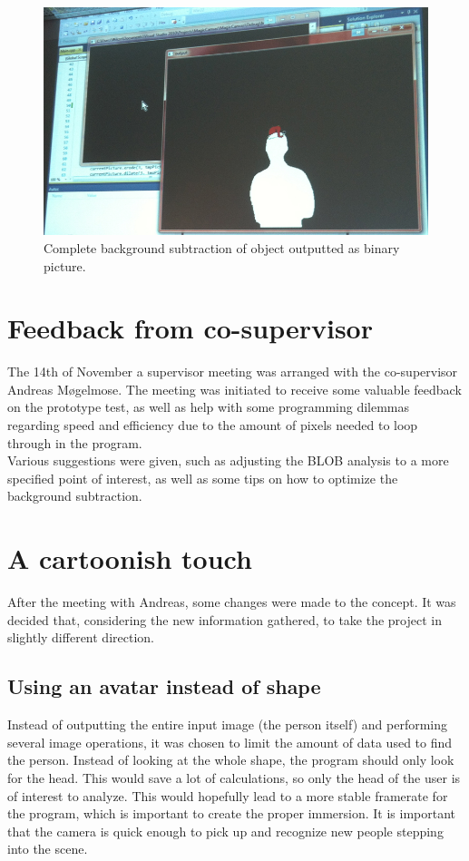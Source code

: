 \begin{figure}[htbp]
\centering
\includegraphics[width=1.00\textwidth]{Pictures/Test/MaxSubtracted.jpg}
\caption{Complete background subtraction of object outputted as binary picture.}
\label{fig:max_subtracted}
\end{figure}

\section{Feedback from co-supervisor}
The 14th of November a supervisor meeting was arranged with the co-supervisor Andreas M{\o}gelmose. The meeting was initiated to receive some valuable feedback on the prototype test, as well as help with some programming dilemmas regarding speed and efficiency due to the amount of pixels needed to loop through in the program.\\
Various suggestions were given, such as adjusting the BLOB analysis to a more specified point of interest, as well as some tips on how to optimize the background subtraction.

\section{A cartoonish touch}
After the meeting with Andreas, some changes were made to the concept. It was decided that, considering the new information gathered, to take the project in slightly different direction.

\subsection{Using an avatar instead of shape}
Instead of outputting the entire input image (the person itself) and performing several image operations, it was chosen to limit the amount of data used to find the person. Instead of looking at the whole shape, the program should only look for the head. This would save a lot of calculations, so only the head of the user is of interest to analyze. This would hopefully lead to a more stable framerate for the program, which is important to create the proper immersion. It is important that the camera is quick enough to pick up and recognize new people stepping into the scene.

